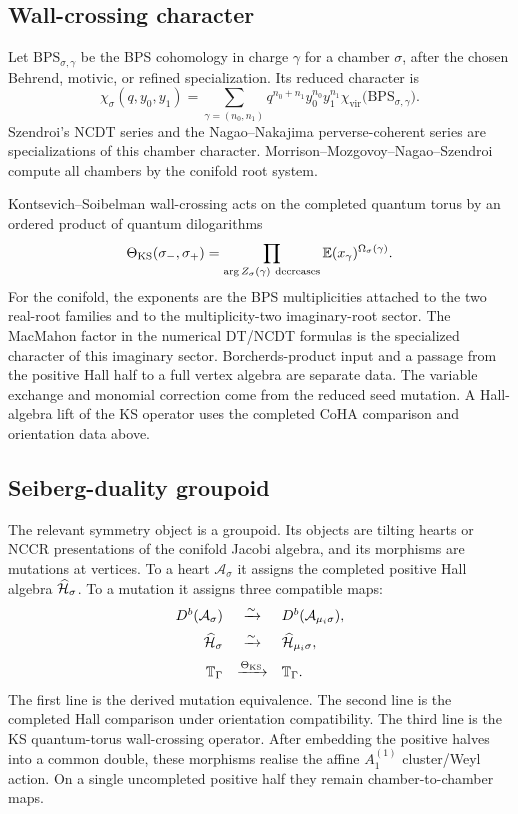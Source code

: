 \subsection*{Wall-crossing character}

Let $\mathrm{BPS}_{\sigma,\gamma}$ be the BPS cohomology in charge
$\gamma$ for a chamber $\sigma$, after the chosen Behrend, motivic, or
refined specialization.  Its reduced character is
\[
  \chi_\sigma(q,y_0,y_1)
  =
  \sum_{\gamma=(n_0,n_1)}
  q^{n_0+n_1}y_0^{n_0}y_1^{n_1}
  \chi_{\mathrm{vir}}\bigl(\mathrm{BPS}_{\sigma,\gamma}\bigr).
\]
Szendroi's NCDT series and the Nagao--Nakajima perverse-coherent
series are specializations of this chamber character.
Morrison--Mozgovoy--Nagao--Szendroi compute all chambers by the
conifold root system.

Kontsevich--Soibelman wall-crossing acts on the completed quantum torus
by an ordered product of quantum dilogarithms
\[
  \Theta_{\mathrm{KS}}(\sigma_-,\sigma_+)
  =
  \prod_{\arg Z_\sigma(\gamma)\ \mathrm{decreases}}
  \mathbb{E}(x_\gamma)^{\Omega_\sigma(\gamma)} .
\]
For the conifold, the exponents are the BPS multiplicities attached to
the two real-root families and to the multiplicity-two imaginary-root
sector.  The MacMahon factor in the numerical DT/NCDT formulas is the
specialized character of this imaginary sector.  Borcherds-product input
and a passage from the positive Hall half to a full vertex algebra are
separate data.  The variable exchange and monomial
correction come from the reduced seed mutation.  A Hall-algebra lift of
the KS operator uses the completed CoHA comparison and orientation data
above.

\subsection*{Seiberg-duality groupoid}

The relevant symmetry object is a groupoid.  Its objects are tilting
hearts or NCCR presentations of the conifold Jacobi algebra, and its
morphisms are mutations at vertices.  To a heart $\mathcal A_\sigma$ it
assigns the completed positive Hall algebra
$\widehat{\mathcal{H}}_\sigma$.  To a mutation it assigns three compatible
maps:
\[
\begin{array}{rcl}
  D^{b}(\mathcal A_\sigma) &\xrightarrow{\sim}&
  D^{b}(\mathcal A_{\mu_i\sigma}),\\[2mm]
  \widehat{\mathcal{H}}_\sigma &\xrightarrow{\sim}&
  \widehat{\mathcal{H}}_{\mu_i\sigma},\\[2mm]
  \mathbb{T}_{\Gamma} &\xrightarrow{\Theta_{\mathrm{KS}}}& \mathbb{T}_{\Gamma} .
\end{array}
\]
The first line is the derived mutation equivalence.  The second line is
the completed Hall comparison under orientation compatibility.  The
third line is the KS quantum-torus wall-crossing operator.  After
embedding the positive halves into a common double, these morphisms
realise the affine $A_1^{(1)}$ cluster/Weyl action.  On a single
uncompleted positive half they remain chamber-to-chamber maps.

